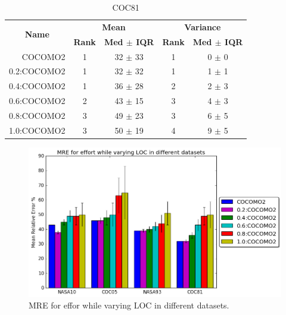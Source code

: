 \documentclass[final,twocolumn,5p]{elsarticle}
\theoremstyle{break}
\begin{document}
\begin{table}[!htpb]
\centering
\caption{COC81}
\scriptsize
\label{tab:coc81}
\begin{tabular}{|r|c|c|c|c|}
\hline
\multicolumn{1}{|c|}{\multirow{2}{*}{\textbf{Name}}} & \multicolumn{2}{c|}{\textbf{Mean}}     & \multicolumn{2}{c|}{\textbf{Variance}} \\ \cline{2-5} 
\multicolumn{1}{|c|}{}                               & \textbf{Rank} & \textbf{Med $\pm$ IQR} & \textbf{Rank} & \textbf{Med $\pm$ IQR} \\ \hline
COCOMO2                                              & 1             & 32 $\pm$ 33            & 1             & 0 $\pm$ 0              \\
0.2:COCOMO2                                          & 1             & 32 $\pm$ 32            & 1             & 1 $\pm$ 1              \\ \cline{4-5}
0.4:COCOMO2                                          & 1             & 36 $\pm$ 28            & 2             & 2 $\pm$ 3              \\ \cline{2-5}
0.6:COCOMO2                                          & 2             & 43 $\pm$ 15            & 3             & 4 $\pm$ 3              \\ \cline{2-3}
0.8:COCOMO2                                          & 3             & 49 $\pm$ 23            & 3             & 6 $\pm$ 5              \\ \cline{4-5}
1.0:COCOMO2                                          & 3             & 50 $\pm$ 19            & 4             & 9 $\pm$ 5      \\ \hline       
\end{tabular}
\end{table}

 
\begin{figure}
    \centering
    \includegraphics[scale=0.5]{Figs/mre.png}
    \caption{MRE for effor while varying LOC in different datasets.}
    \label{fig:mre_datasets}
\end{figure}
\end{document}
